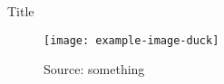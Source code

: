\documentclass{beamer}
\begin{document}
\begin{frame}{Title}
\begin{figure}
\texttt{[image: example-image-duck]}
\caption{Source: something}
\end{figure}
\end{frame}
\end{document}
